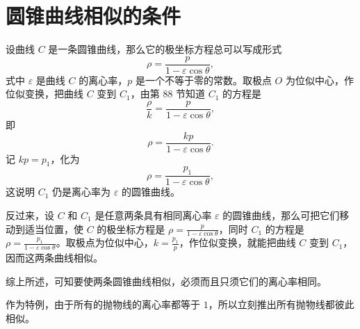 \section{圆锥曲线相似的条件}

设曲线 $C$ 是一条圆锥曲线，那么它的极坐标方程总可以写成形式
\[
  \rho = \frac{p}{1 - \varepsilon\cos\theta},
\]
式中 $\varepsilon$ 是曲线 $C$ 的离心率，$p$ 是一个不等于零的常数。取极点 $O$ 为位似中心，作位似变换，把曲线 $C$ 变到 $C_1$，由第 88 节知道 $C_1$ 的方程是
\[
  \frac{\rho}{k} = \frac{p}{1 - \varepsilon\cos\theta},
\]
即
\[
  \rho = \frac{kp}{1 - \varepsilon\cos\theta}.
\]
记 $kp = p_1$，化为
\[
  \rho = \frac{p_1}{1 - \varepsilon\cos\theta},
\]
这说明 $C_1$ 仍是离心率为 $\varepsilon$ 的圆锥曲线。

反过来，设 $C$ 和 $C_1$ 是任意两条具有相同离心率 $\varepsilon$ 的圆锥曲线，那么可把它们移动到适当位置，使 $C$ 的极坐标方程是 $\rho = \frac{p}{1 - \varepsilon\cos\theta}$，同时 $C_1$ 的方程是 $\rho = \frac{p_1}{1 - \varepsilon\cos\theta}$。取极点为位似中心，$k = \frac{p_1}{p}$，作位似变换，就能把曲线 $C$ 变到 $C_1$，因而这两条曲线相似。

综上所述，可知要使两条圆锥曲线相似，必须而且只须它们的离心率相同。

作为特例，由于所有的抛物线的离心率都等于 $1$，所以立刻推出所有抛物线都彼此相似。
